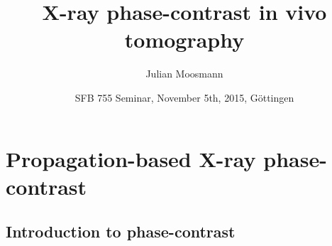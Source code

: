\documentclass{beamer}
\title[X-ray phase-contrast in vivo tomography]
{X-ray phase-contrast in vivo tomography}
\author{Julian Moosmann}
\institute{KTH Royal Institute of Technology, Stockholm}
\date{SFB 755 Seminar, November 5th, 2015, Göttingen}
\begin{document}

\begin{frame}
  \titlepage
\end{frame}


\section{Propagation-based X-ray phase-contrast}
\subsection{Introduction to phase-contrast}
\end{document}
